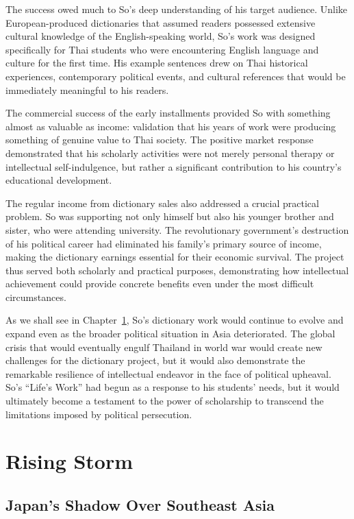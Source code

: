 \documentclass[
  Letterpaper,
]{scrbook}
\begin{document}
The success owed much to So's deep understanding of his target audience.
Unlike European-produced dictionaries that assumed readers possessed
extensive cultural knowledge of the English-speaking world, So's work
was designed specifically for Thai students who were encountering
English language and culture for the first time. His example sentences
drew on Thai historical experiences, contemporary political events, and
cultural references that would be immediately meaningful to his readers.

The commercial success of the early installments provided So with
something almost as valuable as income: validation that his years of
work were producing something of genuine value to Thai society. The
positive market response demonstrated that his scholarly activities were
not merely personal therapy or intellectual self-indulgence, but rather
a significant contribution to his country's educational development.

The regular income from dictionary sales also addressed a crucial
practical problem. So was supporting not only himself but also his
younger brother and sister, who were attending university. The
revolutionary government's destruction of his political career had
eliminated his family's primary source of income, making the dictionary
earnings essential for their economic survival. The project thus served
both scholarly and practical purposes, demonstrating how intellectual
achievement could provide concrete benefits even under the most
difficult circumstances.

As we shall see in Chapter~\ref{sec-rising-storm}, So's dictionary work
would continue to evolve and expand even as the broader political
situation in Asia deteriorated. The global crisis that would eventually
engulf Thailand in world war would create new challenges for the
dictionary project, but it would also demonstrate the remarkable
resilience of intellectual endeavor in the face of political upheaval.
So's ``Life's Work'' had begun as a response to his students' needs, but
it would ultimately become a testament to the power of scholarship to
transcend the limitations imposed by political persecution.


\chapter{Rising Storm}\label{sec-rising-storm}

\section{Japan's Shadow Over Southeast
Asia}\label{japans-shadow-over-southeast-asia}
\end{document}
